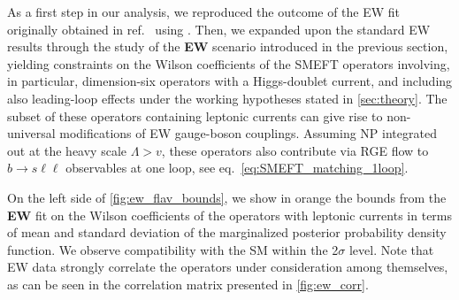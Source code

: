 As a first step in our analysis, we reproduced the outcome of the EW fit originally obtained in ref.~\cite{Efrati:2015eaa} using \HEPfit. %
Then, we expanded upon the standard EW results through the study of the {\bf EW} scenario introduced in the previous section, yielding constraints on the Wilson coefficients of the SMEFT operators involving, in particular, dimension-six operators with a Higgs-doublet current, and including also leading-loop effects under the working hypotheses stated in \autoref{sec:theory}. The subset of these operators containing leptonic currents can give rise to non-universal modifications of EW gauge-boson couplings. Assuming NP integrated out at the heavy scale $\Lambda > v$, these operators also contribute via RGE flow to $b \to s \ell \ell $ observables at one loop, see eq.~\eqref{eq:SMEFT_matching_1loop}.

{On the left side of \autoref{fig:ew_flav_bounds}, we show in orange the bounds from the {\bf EW} fit on the Wilson coefficients of the operators with leptonic currents in terms of mean and standard deviation of the marginalized posterior probability density function. We observe compatibility with the SM within the 2$\sigma$ level. Note that EW data strongly correlate the operators under consideration among themselves, as can be seen in the correlation matrix presented in \autoref{fig:ew_corr}.\unskip\parfillskip 0pt \par}

